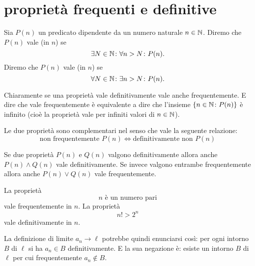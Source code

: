 \section{proprietà frequenti e definitive}

\begin{definition}
Sia $P(n)$ un predicato dipendente da un numero naturale $n\in \mathbb N$.
Diremo che $P(n)$ vale  (in $n$) se
\[
  \exists N\in \mathbb N \colon \forall n>N\colon P(n).
\]
Diremo che $P(n)$ vale  (in $n$) se
\[
  \forall N\in \mathbb N \colon \exists n>N \colon P(n).
\]
\end{definition}

Chiaramente se una proprietà vale definitivamente vale anche frequentemente.
E dire che vale frequentemente è equivalente a dire che
l'insieme ${\left\{ n\in \mathbb N\colon P(n) \right\}}$ è infinito (cioè la proprietà vale per infiniti
valori di $n\in \mathbb N$).

Le due proprietà sono complementari nel senso che vale la seguente
relazione:
\[
  \text{non frequentemente $P(n)$} \iff
  \text{definitivamente non $P(n)$}
\]

Se due proprietà $P(n)$ e $Q(n)$ valgono definitivamente allora anche
$P(n)\land Q(n)$ vale definitivamente. Se invece valgono entrambe
frequentemente allora anche $P(n) \lor Q(n)$ vale frequentemente.

\begin{example}
La proprietà
\[
  \text{$n$ è un numero pari}
\]
vale frequentemente in $n$. La proprietà
\[
 \text{$n! > 2^n$}
\]
vale definitivamente in $n$.
\end{example}

La definizione di limite $a_n \to \ell$ potrebbe quindi enunciarsi così:
per ogni intorno $B$ di $\ell$ si ha $a_n\in B$ definitivamente.
E la sua negazione è: esiste un intorno $B$ di $\ell$ per cui
frequentemente $a_n\not\in B$.

